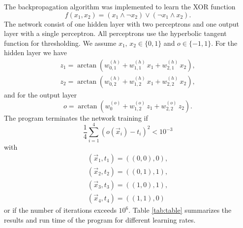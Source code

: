 The backpropagation algorithm was implemented to learn the XOR function
\[
f(x_{1},x_{2})=(x_{1}\land\lnot x_{2})\lor(\lnot x_{1}\land x_{2}).
\]
The network consist of one hidden layer with two perceptrons and one
output layer with a single perceptron. All perceptrons use the hyperbolic
tangent function for thresholding. We assume $x_{1},\, x_{2}\in\{0,1\}$
and $o\in\{-1,1\}$. For the hidden layer we have
\[
\begin{gathered}z_{1}=\arctan\left(w_{0,1}^{(h)}+w_{1,1}^{(h)}\, x_{1}+w_{2,1}^{(h)}\, x_{2}\right),\\
z_{2}=\arctan\left(w_{0,2}^{(h)}+w_{1,2}^{(h)}\, x_{1}+w_{2,2}^{(h)}\, x_{2}\right),
\end{gathered}
\]
and for the output layer
\[
o=\arctan\left(w_{0}^{(o)}+w_{1,2}^{(o)}\, z_{1}+w_{2,2}^{(o)}\, z_{2}\right).
\]
The program terminates the network training if
\[
\frac{1}{4}\sum_{i=1}^{4}(o(\vec{x}_{i})-t_{i})^{2}<10^{-3}
\]
with 
\[
\begin{gathered}(\vec{x}_{1},t_{1})=\left((0,0),0\right),\\
(\vec{x}_{2},t_{2})=\left((0,1),1\right),\\
(\vec{x}_{3},t_{3})=\left((1,0),1\right),\\
(\vec{x}_{4},t_{4})=\left((1,1),0\right)
\end{gathered}
\]
or if the number of iterations exceeds $10^{6}$. Table \ref{tab:table}
summarizes the results and run time of the program for different learning
rates.